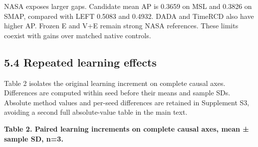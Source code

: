 \documentclass[
  english,
  10pt,
]{article}
\begin{document}
NASA exposes larger gaps. Candidate mean AP is 0.3659 on MSL and 0.3826
on SMAP, compared with LEFT 0.5083 and 0.4932. DADA and TimeRCD also
have higher AP. Frozen E and V+E remain strong NASA references. These
limits coexist with gains over matched native controls.

\subsection{5.4 Repeated learning
effects}\label{repeated-learning-effects}

Table 2 isolates the original learning increment on complete causal
axes. Differences are computed within seed before their means and sample
SDs. Absolute method values and per-seed differences are retained in
Supplement S3, avoiding a second full absolute-value table in the main
text.

\textbf{Table 2. Paired learning increments on complete causal axes,
mean ± sample SD, n=3.}
\end{document}
